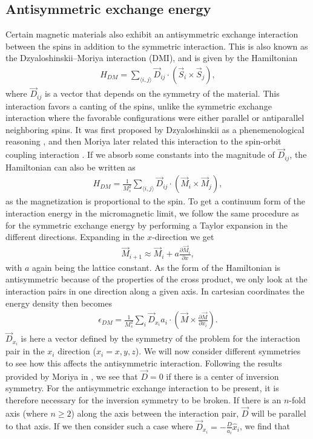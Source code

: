 \documentclass[12pt, a4paper, twoside, openright]{article}		%
\numberwithin{equation}{section}
\begin{document}
\subsection{Antisymmetric exchange energy}
Certain magnetic materials also exhibit an antisymmetric exchange interaction between the spins in addition to the symmetric interaction. This is also known as the Dzyaloshinskii--Moriya interaction (DMI), and is given by the Hamiltonian
\begin{align}
\label{eq:DMI_Hamiltonian_S}
H_{DM} = \sum_{\langle i,j \rangle} \vec{D}_{ij} \cdot (\vec{S}_i\times\vec{S}_j),
\end{align}
where $\vec{D}_{ij}$ is a vector that depends on the symmetry of the material. This interaction favors a canting of the spins, unlike the symmetric exchange interaction where the favorable configurations were either parallel or antiparallel neighboring spins. It was first proposed by Dzyaloshinskii as a phenemenological reasoning \cite{Dzyaloshinskii1958}, and then Moriya later related this interaction to the spin-orbit coupling interaction \cite{Moriya1960}. If we absorb some constants into the magnitude of $\vec{D}_{ij}$, the Hamiltonian can also be written as
\begin{align}
\label{eq:DMI_Hamiltonian_M}
H_{DM} = \frac{1}{M_s^2}\sum_{\langle i,j \rangle} \vec{D}_{ij} \cdot (\vec{M}_i\times\vec{M}_j),
\end{align}
as the magnetization is proportional to the spin. To get a continuum form of the interaction energy in the micromagnetic limit, we follow the same procedure as for the symmetric exchange energy by performing a Taylor expansion in the different directions. Expanding in the $x$-direction we get
\begin{align}
\vec{M}_{i+1} \approx \vec{M}_i + a\frac{\partial \vec{M}_i}{\partial x},
\end{align}
with $a$ again being the lattice constant. As the form of the Hamiltonian is antisymmetric because of the properties of the cross product, we only look at the interaction pairs in one direction along a given axis. In cartesian coordinates the energy density then becomes
\begin{align}
\epsilon_{DM} = \frac{1}{M_s^2}\sum_i\vec{D}_{x_i}a_i\cdot(\vec{M}\times\frac{\partial \vec{M}}{\partial x_i}).
\end{align}
$\vec{D}_{x_i}$ is here a vector defined by the symmetry of the problem for the interaction pair in the $x_i$ direction ($x_i = x, y, z$). We will now consider different symmetries to see how this affects the antisymmetric interaction. Following the results provided by Moriya in \cite{Moriya1960}, we see that $\vec{D} = 0$ if there is a center of inversion symmetry. For the antisymmetric exchange interaction to be present, it is therefore necessary for the inversion symmetry to be broken. If there is an $n$-fold axis (where $n\geq2$) along the axis between the interaction pair, $\vec{D}$ will be parallel to that axis. If we then consider such a case where $\vec{D}_{x_i} = -\frac{D}{a_i} \hat{x}_i$, we find that
\end{document}
